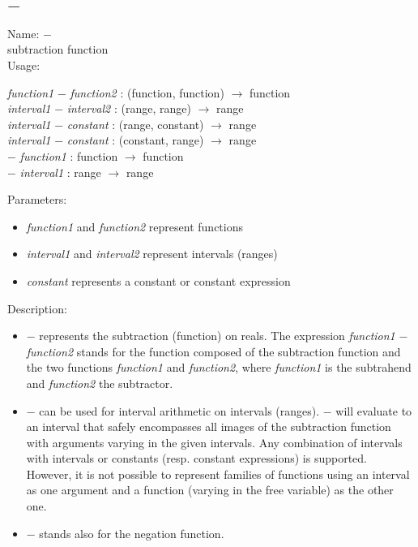 \subsection{$-$}
\label{labminus}
\noindent Name: \textbf{$-$}\\
subtraction function\\
\noindent Usage: 
\begin{center}
\emph{function1} \textbf{$-$} \emph{function2} : (\textsf{function}, \textsf{function}) $\rightarrow$ \textsf{function}\\
\emph{interval1} \textbf{$-$} \emph{interval2} : (\textsf{range}, \textsf{range}) $\rightarrow$ \textsf{range}\\
\emph{interval1} \textbf{$-$} \emph{constant} : (\textsf{range}, \textsf{constant}) $\rightarrow$ \textsf{range}\\
\emph{interval1} \textbf{$-$} \emph{constant} : (\textsf{constant}, \textsf{range}) $\rightarrow$ \textsf{range}\\
\textbf{$-$} \emph{function1} : \textsf{function} $\rightarrow$ \textsf{function}\\
\textbf{$-$} \emph{interval1} : \textsf{range} $\rightarrow$ \textsf{range}\\
\end{center}
Parameters: 
\begin{itemize}
\item \emph{function1} and \emph{function2} represent functions
\item \emph{interval1} and \emph{interval2} represent intervals (ranges)
\item \emph{constant} represents a constant or constant expression
\end{itemize}
\noindent Description: \begin{itemize}

\item \textbf{$-$} represents the subtraction (function) on reals. 
   The expression \emph{function1} \textbf{$-$} \emph{function2} stands for
   the function composed of the subtraction function and the two
   functions \emph{function1} and \emph{function2}, where \emph{function1} is 
   the subtrahend and \emph{function2} the subtractor.

\item \textbf{$-$} can be used for interval arithmetic on intervals
   (ranges). \textbf{$-$} will evaluate to an interval that safely
   encompasses all images of the subtraction function with arguments varying
   in the given intervals.  Any combination of intervals with intervals
   or constants (resp. constant expressions) is supported. However, it is
   not possible to represent families of functions using an interval as
   one argument and a function (varying in the free variable) as the
   other one.

\item \textbf{$-$} stands also for the negation function.
\end{itemize}
